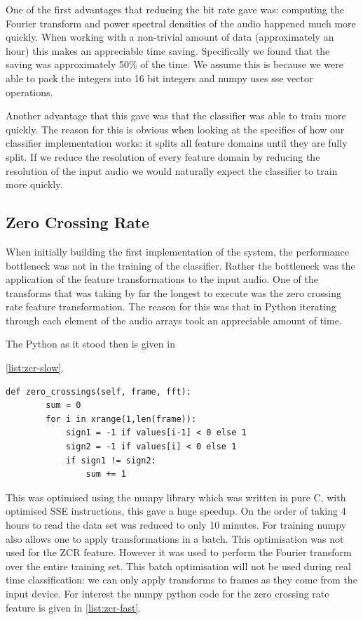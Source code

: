 \documentclass[ %
                    author={Sam Phippen},
                supervisor={Dr. Rafal Bogacz},
                     title={Real time voice activity detectors in noisy personal computing environments},
                  subtitle={},
                    degree={MEng},
                      year={2012} ]{thesis}
\begin{document}
One of the first advantages that reducing the bit rate gave was: computing the
Fourier transform and power spectral densities of the audio happened much more
quickly. When working with a non-trivial amount of data (approximately an hour)
this makes an appreciable time saving. Specifically we found that the saving
was approximately 50\% of the time. We assume this is because we were able to
pack the integers into 16 bit integers and numpy uses sse vector operations.

Another advantage that this gave was that the classifier was able to train more
quickly. The reason for this is obvious when looking at the specifics of how
our classifier implementation works: it splits all feature domains until they
are fully split. If we reduce the resolution of every feature domain by
reducing the resolution of the input audio we would naturally expect the
classifier to train more quickly.

\subsection{Zero Crossing Rate}

When initially building the first implementation of the system, the performance
bottleneck was not in the training of the classifier. Rather the bottleneck was
the application of the feature transformations to the input audio. One of the
transforms that was taking by far the longest to execute was the zero crossing
rate feature transformation. The reason for this was that in Python iterating
through each element of the audio arrays took an appreciable amount of time.

The Python as it stood then is given in

\ref{list:zcr-slow}.


\begin{lstlisting}[frame=single,caption=Original slow zero crossing rate implementation, label=list:zcr-slow]  % Start your code-block
    def zero_crossings(self, frame, fft):
        sum = 0
        for i in xrange(1,len(frame)):
            sign1 = -1 if values[i-1] < 0 else 1
            sign2 = -1 if values[i] < 0 else 1
            if sign1 != sign2:
                sum += 1
\end{lstlisting}

This was optimised using the numpy library which was written in pure C, with
optimised SSE instructions, this gave a huge speedup. On the order of taking 4
hours to read the data set was reduced to only 10 minutes. For training numpy
also allows one to apply transformations in a batch. This optimisation was not
used for the ZCR feature. However it was used to perform the Fourier transform
over the entire training set. This batch optimisation will not be used during
real time classification: we can only apply transforms to frames as they come
from the input device. For interest the numpy python code for the zero crossing
rate feature is given in \ref{list:zcr-fast}.
\end{document}

